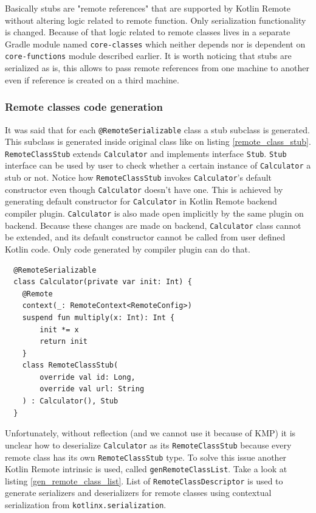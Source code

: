 \documentclass[a4paper,11pt,oneside]{article}
\newcommand{\kotlini}[1]{\texttt{#1}}
\newcommand{\ki}[1]{\kotlini{#1}}
\begin{document}
Basically stubs are "remote references" that are supported by Kotlin Remote without altering logic
related to remote function. Only serialization functionality is changed. Because of that logic
related to remote classes lives in a separate Gradle module named \texttt{core-classes} which
neither depends nor is dependent on \texttt{core-functions} module described earlier. It is worth
noticing that stubs are serialized as is, this allows to pass remote references from one machine to
another even if reference is created on a third machine.

\subsubsection{Remote classes code generation}

It was said that for each \ki{@RemoteSerializable} class a stub subclass is generated. This
subclass is generated inside original class like on listing \ref{remote_class_stub}.
\ki{RemoteClassStub} extends \ki{Calculator} and implements interface \ki{Stub}. \ki{Stub}
interface can be used by user to check whether a certain instance of \ki{Calculator} a stub or not.
Notice how \ki{RemoteClassStub} invokes \ki{Calculator}'s default constructor even though
\ki{Calculator} doesn't have one. This is achieved by generating default constructor for
\ki{Calculator} in Kotlin Remote backend compiler plugin. \ki{Calculator} is also made open
implicitly by the same plugin on backend. Because these changes are made on backend,
\ki{Calculator} class cannot be extended, and its default constructor cannot be called from user
defined Kotlin code. Only code generated by compiler plugin can do that.

\begin{listing}[!h]
  \begin{verbatim}
  @RemoteSerializable
  class Calculator(private var init: Int) {
    @Remote
    context(_: RemoteContext<RemoteConfig>)
    suspend fun multiply(x: Int): Int {
        init *= x
        return init
    }
    class RemoteClassStub(
        override val id: Long,
        override val url: String
    ) : Calculator(), Stub
  }
  \end{verbatim}
  \caption{Remote class stub}\label{remote_class_stub}
\end{listing}

Unfortunately, without reflection (and we cannot use it because of KMP) it is unclear how to deserialize
\ki{Calculator} as its \ki{RemoteClassStub} because every remote class has its own \ki{RemoteClassStub} type.
To solve this issue another Kotlin Remote intrinsic is used, called \ki{genRemoteClassList}.
Take a look at listing \ref{gen_remote_class_list}. List of \ki{RemoteClassDescriptor} is used to generate
serializers and deserializers for remote classes using contextual serialization from \texttt{kotlinx.serialization}.
\end{document}
